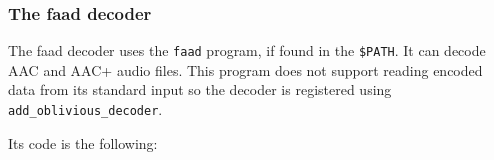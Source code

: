 \subsubsection{The faad decoder}
The faad decoder uses the \verb+faad+ program, if found in the \verb+$PATH+.  It
can decode AAC and AAC+ audio files. This program does not support reading
encoded data from its standard input so the decoder is registered using
\verb+add_oblivious_decoder+.

Its code is the following:




